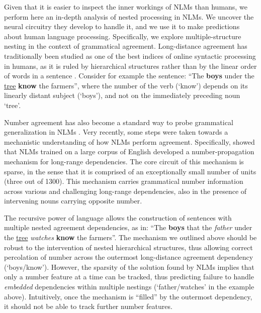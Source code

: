 Given that it is easier to inspect the inner workings of NLMs than humans, we perform here an in-depth analysis of nested processing in NLMs. 
We uncover the neural circuitry they develop to handle it, and we use it to make predictions about human language processing. 
%
Specifically, we explore multiple-structure nesting in the context of grammatical agreement. Long-distance agreement has traditionally been studied as one of the  best indices of online syntactic processing in humans, as it is ruled
by hierarchical structures rather than by the linear order of words in
a sentence \citep{Bock:Miller:1991, franck2002subject}. Consider for example the sentence: ``The \textbf{boys} under the \underline{tree} \textbf{know} the farmers'', where the number of the verb (`know') depends on its linearly distant subject (`boys'), and not on the immediately preceding noun `tree'.

Number agreement has also become a standard way to probe grammatical
generalization in NLMs \citep{Linzen:etal:2016,Bernardy:Lappin:2017,Giulianelli:etal:2018,Gulordava:etal:2018}. Very
recently, some steps were taken towards a mechanistic understanding of
how NLMs perform agreement. Specifically, \citet{lakretz2019emergence} showed that NLMs trained
on a large corpus of English developed a number-propagation mechanism for long-range dependencies. The core circuit of this mechanism is sparse, in the sense that it is comprised of an exceptionally small number of units (three out of 1300). This mechanism carries grammatical number information across various and challenging long-range dependencies, also in the presence of intervening nouns carrying opposite number.

The recursive power of language allows the construction of sentences with multiple nested agreement dependencies, as in: ``The \textbf{boys} that the \textit{father} under the \underline{tree} \textit{watches} \textbf{know} the farmers''. The mechanism we outlined above should be robust to the intervention of nested hierarchical structures, thus allowing correct percolation of number across the outermost long-distance agreement dependency (`boys/know'). However, the sparsity of the solution found by NLMs implies that only a number feature at a time can be tracked, thus predicting failure to handle \emph{embedded} dependencies within multiple nestings (`father/watches' in the example above). Intuitively, once the mechanism is ``filled'' by the outermost
dependency, it should not be able to track further number features.

